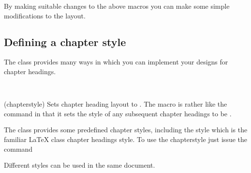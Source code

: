 By making suitable changes to the above macros you can make some
simple modifications to the layout.


\subsection{Defining a chapter style} \label{sec:chapterstyle}


    The class provides many ways in which you can implement your designs
for chapter headings.

\begin{syntax}
\cmd{\chapterstyle} \\
\end{syntax}
\glossary(chapterstyle)%
  {}%
  {Sets chapter heading layout to .}
The macro \cmd{\chapterstyle} is rather like the \cmd{\pagestyle} command in 
that it sets the style of any subsequent chapter headings to be .

    The class provides some predefined chapter styles, including the 
 style which is the familiar LaTeX  class chapter
headings style. To use the chapterstyle  just issue the command
\begin{lcode}
\end{lcode}
Different styles can be used in the same document.

